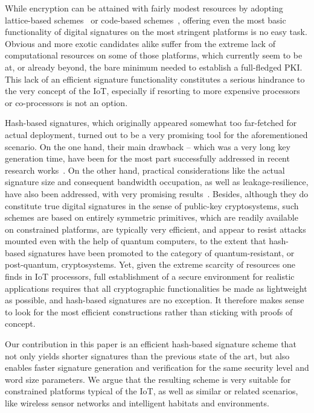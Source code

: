 \documentclass[11pt]{llncs}
\begin{document}
While encryption can be attained with fairly modest resources by adopting lattice-based schemes~\cite{hoffstein-pipher-silverman} or code-based schemes~\cite{misoczki-sendrier-tillich-barreto}, offering even the most basic functionality of digital signatures on the most stringent platforms is no easy task. Obvious and more exotic candidates alike suffer from the extreme lack of computational resources on some of those platforms, which currently seem to be at, or already beyond, the bare minimum needed to establish a full-fledged PKI. This lack of an efficient signature functionality constitutes a serious hindrance to the very concept of the IoT, especially if resorting to more expensive processors or co-processors is not an option.

Hash-based signatures, which originally appeared somewhat too far-fetched for actual deployment, turned out to be a very promising tool for the aforementioned scenario. On the one hand, their main drawback -- which was a very long key generation time, have been for the most part successfully addressed in recent research works~\cite{buchman-dahmen-klintsevich-okeya-vuillaume}. On the other hand, practical considerations like the actual signature size and consequent bandwidth occupation, as well as leakage-resilience, have also been addressed, with very promising results~\cite{buchmann-dahmen-huelsing,eisenbarth-maurich-ye,huelsing,rohde-eisenbarth-dahmen-buchmann-paar}. Besides, although they do constitute true digital signatures in the sense of public-key cryptosystems, such schemes are based on entirely symmetric primitives, which are readily available on constrained platforms, are typically very efficient, and appear to resist attacks mounted even with the help of quantum computers, to the extent that hash-based signatures have been promoted to the category of quantum-resistant, or post-quantum, cryptosystems. Yet, given the extreme scarcity of resources one finds in IoT processors, full establishment of a secure environment for realistic applications requires that all cryptographic functionalities be made as lightweight as possible, and hash-based signatures are no exception. It therefore makes sense to look for the most efficient constructions rather than sticking with proofs of concept.

Our contribution in this paper is an efficient hash-based signature scheme that not only yields shorter signatures than the previous state of the art, but also enables faster signature generation and verification for the same security level and word size parameters.
We argue that the resulting scheme is very suitable for constrained platforms typical of the IoT, as well as similar or related scenarios, like wireless sensor networks and intelligent habitats and environments.
\end{document}
